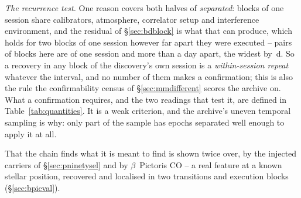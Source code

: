 \emph{The recurrence test.} One reason covers both halves of
\emph{separated}: blocks of one session share calibrators, atmosphere,
correlator setup and interference environment, and the residual of
\S\ref{sec:bdblock} is what that can produce, which holds for two blocks of
one session however far apart they were executed -- \QfNPairDrop{} pairs of
blocks here are of one session and more than a day apart, the widest by
\QfSameSessMaxD\,d. So a recovery in any block of the discovery's own
session is a \emph{within-session repeat} whatever the interval, and no number
of them makes a confirmation; this is also the rule the confirmability census
of \S\ref{sec:mmdifferent} scores the archive on. What a confirmation
requires, and the two readings that test it, are defined in
Table~\ref{tab:quantities}. It is a weak criterion, and the archive's uneven
temporal sampling is why: only part of the sample has epochs separated well
enough to apply it at all.

That the chain finds what it is meant to find is shown twice over, by the
injected carriers of \S\ref{sec:pninetysel} and by $\beta$~Pictoris CO -- a
real feature at a known stellar position, recovered and localised in two
transitions and \CsBpCoBlocks{} execution blocks (\S\ref{sec:bpicval}).

